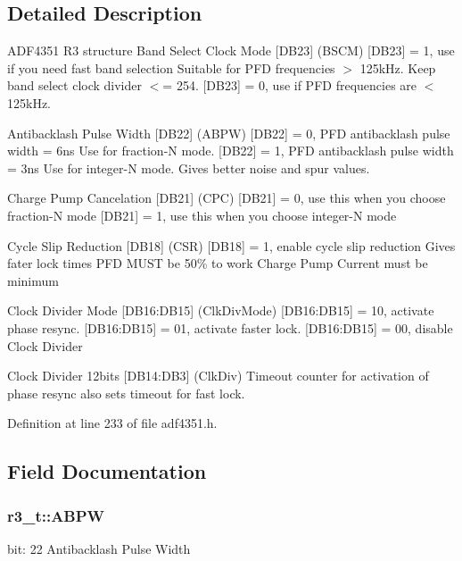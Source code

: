 \subsection{Detailed Description}
A\+D\+F4351 R3 structure Band Select Clock Mode \mbox{[}D\+B23\mbox{]} (B\+S\+CM) \mbox{[}D\+B23\mbox{]} = 1, use if you need fast band selection Suitable for P\+FD frequencies $>$ 125k\+Hz. Keep band select clock divider $<$= 254. \mbox{[}D\+B23\mbox{]} = 0, use if P\+FD frequencies are $<$ 125k\+Hz. 

Antibacklash Pulse Width \mbox{[}D\+B22\mbox{]} (A\+B\+PW) \mbox{[}D\+B22\mbox{]} = 0, P\+FD antibacklash pulse width = 6ns Use for fraction-\/N mode. \mbox{[}D\+B22\mbox{]} = 1, P\+FD antibacklash pulse width = 3ns Use for integer-\/N mode. Gives better noise and spur values.

Charge Pump Cancelation \mbox{[}D\+B21\mbox{]} (C\+PC) \mbox{[}D\+B21\mbox{]} = 0, use this when you choose fraction-\/N mode \mbox{[}D\+B21\mbox{]} = 1, use this when you choose integer-\/N mode

Cycle Slip Reduction \mbox{[}D\+B18\mbox{]} (C\+SR) \mbox{[}D\+B18\mbox{]} = 1, enable cycle slip reduction Gives fater lock times P\+FD M\+U\+ST be 50\% to work Charge Pump Current must be minimum

Clock Divider Mode \mbox{[}D\+B16\+:D\+B15\mbox{]} (Clk\+Div\+Mode) \mbox{[}D\+B16\+:D\+B15\mbox{]} = 10, activate phase resync. \mbox{[}D\+B16\+:D\+B15\mbox{]} = 01, activate faster lock. \mbox{[}D\+B16\+:D\+B15\mbox{]} = 00, disable Clock Divider

Clock Divider 12bits \mbox{[}D\+B14\+:D\+B3\mbox{]} (Clk\+Div) Timeout counter for activation of phase resync also sets timeout for fast lock. 

Definition at line 233 of file adf4351.\+h.



\subsection{Field Documentation}
\subsubsection[{\texorpdfstring{A\+B\+PW}{ABPW}}]{ r3\+\_\+t\+::\+A\+B\+PW}\hypertarget{structr3__t_a5f81f8e2e2dedd4c4b7d939e51ae2c4c}{}\label{structr3__t_a5f81f8e2e2dedd4c4b7d939e51ae2c4c}
bit\+: 22 Antibacklash Pulse Width 

